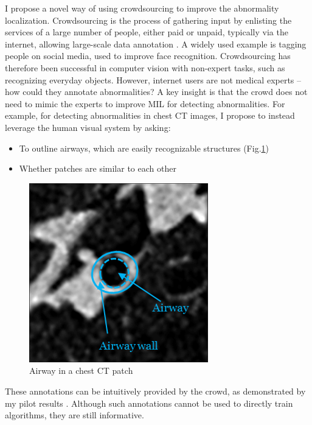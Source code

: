 \documentclass[serif, twocolumn, numeric, rga]{jote-article}
\begin{document}
I propose a novel way of using crowdsourcing \cite{Howe2006} to improve the abnormality localization. Crowdsourcing is the process of gathering input by enlisting the services of a large number of people, either paid or unpaid, typically via the internet, allowing large-scale data annotation \cite{Lin2014}. A widely used example is tagging people on social media, used to improve face recognition. Crowdsourcing has therefore been successful in computer vision \cite{Lin2014, Kovashka2016} with non-expert tasks, such as recognizing everyday objects. However, internet users are not medical experts -- how could they annotate abnormalities? 
A key insight is that the crowd does not need to mimic the experts to improve MIL for detecting abnormalities. For example, for detecting abnormalities in chest CT images, I propose to instead leverage the human visual system by asking: 
\begin{itemize}
\item   To outline airways, which are easily recognizable structures (Fig.\ref{fig:airway}) 
\item   Whether patches are similar to each other 
\end{itemize}


\begin{figure}
\vspace{-10pt}
\centering \includegraphics[width=0.6\columnwidth]{articles/RGAs/Veronika/air.png}
\caption{Airway in a chest CT patch}
\label{fig:airway}
\end{figure}

These annotations can be intuitively provided by the crowd, as demonstrated by my pilot results \cite{Cheplygina2016a, Orting2017}. Although such annotations cannot be used to directly train algorithms, they are still informative.
\end{document}
